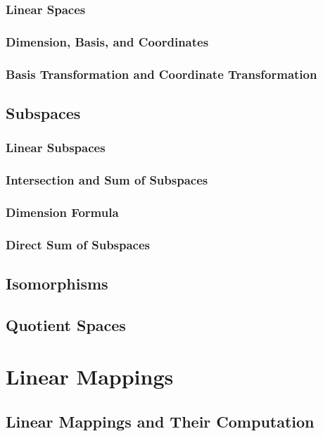 \documentclass[11pt]{elegantbook}
\begin{document}
\subsection{Linear Spaces}

\subsection{Dimension, Basis, and Coordinates}

\subsection{Basis Transformation and Coordinate Transformation}

\section{Subspaces}

\subsection{Linear Subspaces}

\subsection{Intersection and Sum of Subspaces}

\subsection{Dimension Formula}

\subsection{Direct Sum of Subspaces}

\section{Isomorphisms}

\section{Quotient Spaces}

\chapter{Linear Mappings}
\section{Linear Mappings and Their Computation}
\end{document}
